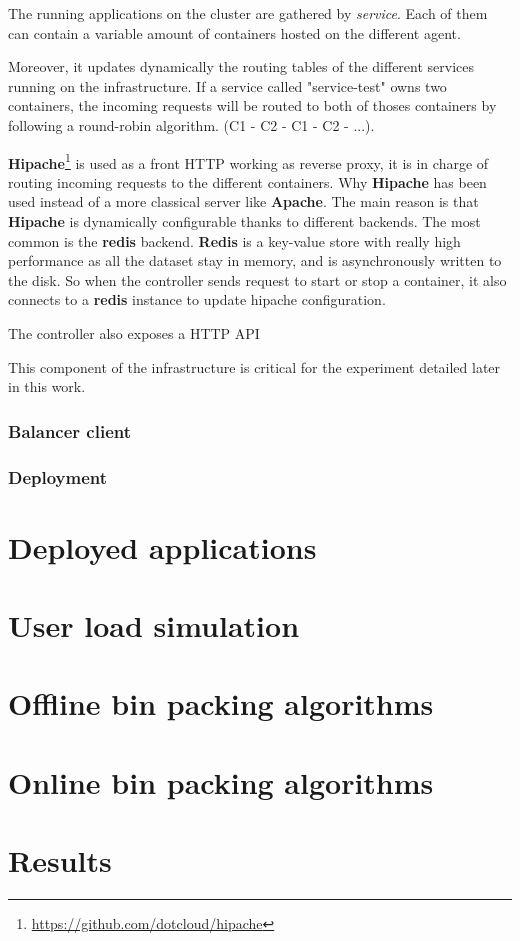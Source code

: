 The running applications on the cluster are gathered by \textit{service}. Each
of them can contain a variable amount of containers hosted on the different agent.

Moreover, it updates dynamically the routing tables of the different services
running on the infrastructure. If a service called "service-test" owns two containers,
the incoming requests will be routed to both of thoses containers by following a
round-robin algorithm. (C1 - C2 - C1 - C2 - ...).

\textbf{Hipache}\footnote{\url{https://github.com/dotcloud/hipache}} is used as
a front HTTP working as reverse proxy, it is in charge of routing incoming requests
to the different containers.
Why \textbf{Hipache} has been used instead of a more classical server like
\textbf{Apache}. The main reason is that \textbf{Hipache} is dynamically
configurable thanks to different backends. The most common is the
\textbf{redis} backend. \textbf{Redis} is a key-value store with really high
performance as all the dataset stay in memory, and is asynchronously written to
the disk. So when the controller sends request to start or stop a container, it
also connects to a \textbf{redis} instance to update hipache configuration.

The controller also exposes a HTTP API

This component of the infrastructure is critical for the experiment detailed
later in this work.

\subsubsection{Balancer client}
\subsubsection{Deployment}

\section{Deployed applications}

\section{User load simulation}

\section{Offline bin packing algorithms}


\section{Online bin packing algorithms}

\section{Results}
